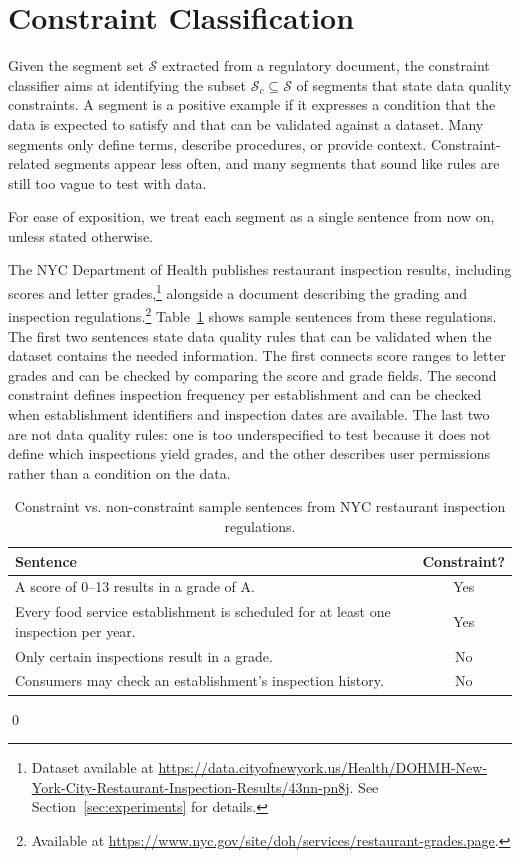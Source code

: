 \section{Constraint Classification}
\label{sec:classifier}
Given the segment set $\mathcal{S}$ extracted from a regulatory document, the constraint classifier aims at identifying the subset $\mathcal{S}_c \subseteq \mathcal{S}$ of segments that state data quality constraints. A segment is a positive example if it expresses a condition that the data is expected to satisfy and that can be 
validated against a dataset. Many segments only define terms, describe procedures, or provide context. Constraint-related segments appear less often, and many segments that sound like rules are still too vague to test with data. 


For ease of exposition, we treat each segment as a single sentence from now on, unless stated otherwise.

\begin{example}
\label{ex:classification}
The NYC Department of Health publishes restaurant inspection results, 
including scores and letter grades,\footnote{Dataset available at 
\url{https://data.cityofnewyork.us/Health/DOHMH-New-York-City-Restaurant-Inspection-Results/43nn-pn8j}. See Section~\ref{sec:experiments} for details.} alongside a document 
describing the grading and inspection regulations.\footnote{Available at 
\url{https://www.nyc.gov/site/doh/services/restaurant-grades.page}.} 
Table~\ref{tab:sentence-types} shows sample sentences from these 
regulations. The first two sentences state data quality rules that can be validated when the dataset contains the needed information. The first connects score ranges to letter grades and can be checked by comparing the score and grade fields. The second constraint defines inspection frequency per establishment and can be checked when establishment identifiers and inspection dates are available. The last two are not data quality rules: one is too underspecified to test because it does not define which inspections yield grades, and the other describes user permissions rather than a condition on the data.
\begin{table}[ht]
\centering
\small
\begin{tabular}{p{}c}
\toprule
\textbf{Sentence} & \textbf{Constraint?} \\
\midrule
A score of 0--13 results in a grade of A. & Yes \\
Every food service establishment is scheduled for at least one inspection per year. & Yes \\
Only certain inspections result in a grade. & No \\
Consumers may check an establishment's inspection history. & No \\
\bottomrule
\end{tabular}
\caption{Constraint vs. non-constraint sample sentences from NYC restaurant inspection regulations.}
\label{tab:sentence-types}
\end{table}
\qed
\end{example}

